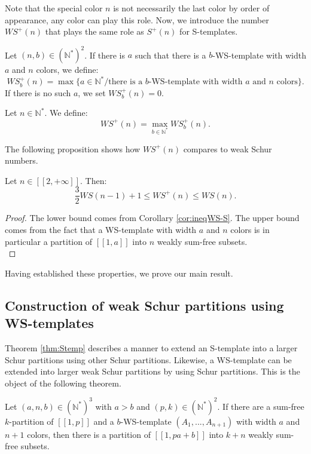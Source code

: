 \documentclass[final,onefignum,onetabnum]{siamart190516}
\newcommand{\WS}{\mathit{WS}}
\begin{document}
Note that the special color \(n\) is not necessarily the last color by order of appearance, any color can play this role.
Now, we introduce the number \(\WS^+(n)\) that plays the same role as \(S^+(n)\) for S-templates. 

\begin{definition}
Let \( (n,b) \in (\mathbb{N}^*)^2\). If there is \(a\) such that there is a \(b\)-WS-template with width \(a\)
and \(n\) colors, we define:
\[
\WS_b^+(n)= \max \{a \in \mathbb{N}^*/ \text{there is a } b \text{-WS-template with width } a \text{ and } n \text{ colors} \}.
\]
If there is no such \(a\), we set \(\WS_b^+(n) = 0\).
\end{definition}

\begin{definition}
Let \( n \in \mathbb{N}^*\). We define:
\[
\WS^+(n)=\max_{b\in \mathbb{N}^*} \WS_b^+(n).
\]
\end{definition}
The following proposition shows how \(\WS^+(n)\) compares to weak Schur numbers.
\begin{proposition}
Let \(n \in [\![2, +\infty]\!]\). Then:
\[
\frac{3}{2} \WS (n-1)+1 \leqslant \WS^+(n) \leqslant \WS (n).
\]
\end{proposition}

\begin{proof}
The lower bound comes from Corollary \ref{cor:ineqWS-S}.
The upper bound comes from the fact that a WS-template with width \(a\) and \(n\) colors is in particular a partition of
\([\![1, a]\!]\) into \(n\) weakly sum-free subsets. \\
\end{proof}

Having established these properties, we prove our main result.

\subsection{Construction of weak Schur partitions using WS-templates}
\label{ConstructionWS}

Theorem \ref{thm:Stemp} describes a manner to extend an S-template into a larger Schur partitions using other Schur 
partitions. Likewise, a WS-template can be extended into larger weak Schur partitions by using Schur partitions. This 
is the object of the following theorem.

\begin{theorem}
\label{thm:WStemp}
Let \((a,n,b) \in (\mathbb{N}^*)^3\) with \(a > b\) and \( (p,k) \in (\mathbb{N}^*)^2\). If there are a sum-free \(k\)-partition of
\([\![1,p]\!]\) and a \(b\)-WS-template \((A_1,...,A_{n+1})\) with width \(a\) and \(n+1\) colors,
then there is a partition of \([\![1, p a + b]\!]\) into \(k+n\) weakly sum-free subsets.
\end{theorem}
\end{document}

